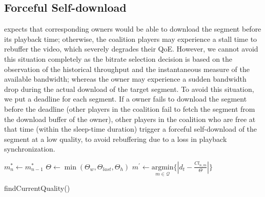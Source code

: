 \subsection{Forceful Self-download} {\our} expects that corresponding owners would be able to download the segment before its playback time; otherwise, the coalition players may experience a stall time to rebuffer the video, which severely degrades their \ac{QoE}. However, we cannot avoid this situation completely as the bitrate selection decision is based on the observation of the historical throughput and the instantaneous measure of the available bandwidth; whereas the owner may experience a sudden bandwidth drop during the actual download of the target segment. To avoid this situation, we put a deadline for each segment. If a owner fails to download the segment before the deadline (other players in the coalition fail to fetch the segment from the download buffer of the owner), other players in the coalition who are free at that time (within the sleep-time duration) trigger a forceful self-download of the segment at a low quality, to avoid rebuffering due to a loss in playback synchronization.
\begin{algorithm}[!ht]
	\DontPrintSemicolon
	$m^*_{n} \leftarrow m^*_{n-1}$ \; \label{algo:chap06:quality:line:mstar}
	$\varTheta \leftarrow \min(\varTheta_w, \varTheta_{last}, \varTheta_h)$ \; \label{algo:chap06:quality:line:theta}
	$m^\prime \leftarrow \underset{m \in \mathcal{Q}}{\mathrm{argmin}} \{\left| d_t - \frac{Cl_{n,m}}{\varTheta}\right| \} $\; \label{algo:chap06:quality:line:mprime}
	\caption{\label{algo:chap06:quality}findCurrentQuality()}
\end{algorithm}
